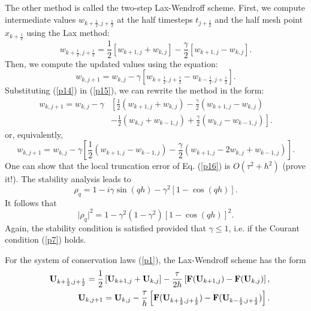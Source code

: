 The other method is called the two-step Lax-Wendroff scheme. First, we compute
intermediate values $w_{k+\frac{1}{2},j+\frac{1}{2}}$ at the half timesteps
$t_{j+\frac{1}{2}}$ and the half mesh point $x_{k+\frac{1}{2}}$ using the Lax method:
\begin{equation}
w_{k+\frac{1}{2},j+\frac{1}{2}}=\frac{1}{2}\left[w_{k+1,j}+w_{k,j}\right] -
\frac{\gamma}{2}\left[w_{k+1,j}-w_{k,j}\right]. \label{p14}
\end{equation}
Then, we compute the updated values using the equation:
\begin{equation}
w_{k,j+1}=w_{k,j}-
\gamma\left[w_{k+\frac{1}{2},j+\frac{1}{2}}-w_{k-\frac{1}{2},j+\frac{1}{2}}\right]. \label{p15}
\end{equation}
Substituting (\ref{p14}) in (\ref{p15}), we can rewrite the method in the form:
\[\begin{split}
w_{k,j+1}=w_{k,j}-
\gamma&\left[
\frac{1}{2}  \left(w_{k+1,j}+w_{k,j}\right)-
\frac{\gamma}{2}\left(w_{k+1,j}-w_{k,j}\right)
\right.\\
&\left.-\frac{1}{2}\left(w_{k,j}+w_{k-1,j}\right)+
\frac{\gamma}{2}\left(w_{k,j}-w_{k-1,j}\right)\right].
\end{split}\]
or, equivalently,
\begin{equation}
w_{k,j+1}=w_{k,j}-
\gamma\left[\frac{1}{2}\left(w_{k+1,j}-w_{k-1,j}\right)-
\frac{\gamma}{2}\left(w_{k+1,j}-2w_{k,j}+w_{k-1,j}\right)\right]. \label{p16}
\end{equation}
One can show that the local truncation error of Eq. (\ref{p16}) is $O(\tau^2+h^2)$ (prove it!). The stability
analysis leads to
\[
\rho_{q}=1-i\gamma\sin(qh)-\gamma^2[1-\cos(qh)].
\]
It follows that
\[
\vert\rho_{q}\vert^2=1-\gamma^2(1-\gamma^2)[1-\cos(qh)]^2.
\]
Again, the stability condition is satisfied provided that $\gamma\leq 1$, i.e.
if the Courant condition (\ref{p7}) holds.

 
 
For the system of conservation laws (\ref{p1}), the Lax-Wendroff scheme has the form
\begin{eqnarray}
&&{\bf U}_{k+\frac{1}{2},j+\frac{1}{2}}=\frac{1}{2}\left[{\bf U}_{k+1,j}+{\bf U}_{k,j}\right] -
\frac{\tau}{2h}\left[{\bf F}({\bf U}_{k+1,j})-{\bf F}({\bf U}_{k,j})\right], \nonumber \\
&&{\bf U}_{k,j+1}={\bf U}_{k,j}-
\frac{\tau}{h}\left[{\bf F}({\bf U}_{k+\frac{1}{2},j+\frac{1}{2}})-
{\bf F}({\bf U}_{k-\frac{1}{2},j+\frac{1}{2}})\right]. \label{p17}
\end{eqnarray}






